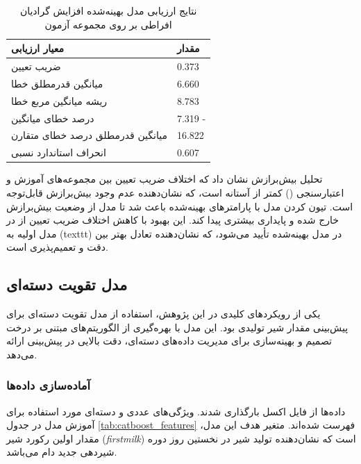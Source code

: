 \vspace{0.3cm}
\begin{table}[H]
	\centering
	\caption{نتایج ارزیابی مدل بهینه‌شده افزایش گرادیان افراطی بر روی مجموعه آزمون}
	\renewcommand{\arraystretch}{1.3}
	\begin{tabular}{
			>{\centering\arraybackslash}m{4cm}
			>{\centering\arraybackslash}m{3cm}
		}
		\toprule
		\textbf{معیار ارزیابی} & \textbf{مقدار} \\
		\midrule
		ضریب تعیین & \num{0.373} \\
		میانگین قدرمطلق خطا & \num{6.660} \\
		ریشه میانگین مربع خطا & \num{8.783} \\
		درصد خطای میانگین & \num{7.319} - \\
		میانگین قدرمطلق درصد خطای متقارن & \num{16.822} \\
		انحراف استاندارد نسبی & \num{0.607} \\
		\bottomrule
	\end{tabular}
	\label{tab:xgboost_tuned}
\end{table}
\vspace{0.5cm}

تحلیل بیش‌برازش نشان داد که اختلاف ضریب تعیین بین مجموعه‌های آموزش و اعتبارسنجی (\texttt{}) کمتر از آستانه \texttt{} است، که نشان‌دهنده عدم وجود بیش‌برازش قابل‌توجه است. تیون کردن مدل با پارامترهای بهینه‌شده باعث شد تا مدل از وضعیت بیش‌برازش خارج شده و پایداری بیشتری پیدا کند. این بهبود با کاهش اختلاف ضریب تعیین از \texttt{} در مدل اولیه به (texttt{}) در مدل بهینه‌شده تأیید می‌شود، که نشان‌دهنده تعادل بهتر بین دقت و تعمیم‌پذیری است.


\subsection{مدل تقویت دسته‌ای}

یکی از رویکردهای کلیدی در این پژوهش، استفاده از مدل تقویت دسته‌ای برای پیش‌بینی مقدار شیر تولیدی بود. این مدل با بهره‌گیری از الگوریتم‌های مبتنی بر درخت تصمیم و بهینه‌سازی برای مدیریت داده‌های دسته‌ای، دقت بالایی در پیش‌بینی ارائه می‌دهد.

\subsubsection{آماده‌سازی داده‌ها}

داده‌ها از فایل اکسل بارگذاری شدند. ویژگی‌های عددی و دسته‌ای مورد استفاده برای آموزش مدل در جدول \ref{tab:catboost_features} فهرست شده‌اند. متغیر هدف این مدل، مقدار اولین رکورد شیر (\textit{firstmilk}) است که نشان‌دهنده تولید شیر در نخستین روز دوره شیردهی جدید دام می‌باشد.

